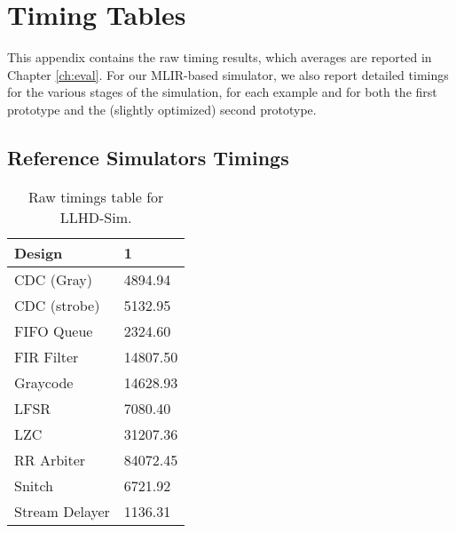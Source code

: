 \chapter{Timing Tables}
\label{app:timings}
This appendix contains the raw timing results, which averages are reported in Chapter \ref{ch:eval}. For our MLIR-based simulator, we also report detailed timings for the various stages of the simulation, for each example and for both the first prototype and the (slightly optimized) second prototype.

\section{Reference Simulators Timings}

\begin{table}[ht]
    \centering
    \begin{tabular}{ll}
        \toprule
        \textbf{Design} & \textbf{1} \\
        \toprule
        CDC (Gray)      & 4894.94    \\
        CDC (strobe)    & 5132.95    \\
        FIFO Queue      & 2324.60    \\
        FIR Filter      & 14807.50   \\
        Graycode        & 14628.93   \\
        LFSR            & 7080.40    \\
        LZC             & 31207.36   \\
        RR Arbiter      & 84072.45   \\
        Snitch          & 6721.92    \\
        Stream Delayer  & 1136.31    \\
        \bottomrule
    \end{tabular}
    \caption{Raw timings table for LLHD-Sim.}
\end{table}

